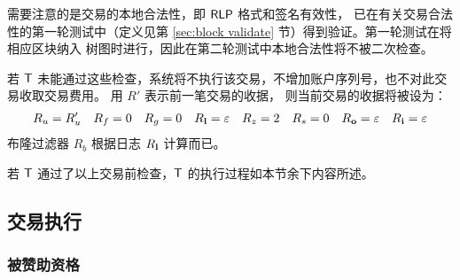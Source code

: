 需要注意的是交易的本地合法性，即 $\mathsf{RLP}$ 格式和签名有效性，
已在有关交易合法性的第一轮测试中（定义见第 \ref{sec:block validate} 节）得到验证。第一轮测试在将相应区块纳入 \name 树图时进行，因此在第二轮测试中本地合法性将不被二次检查。

若 $\textsf{T}$ 未能通过这些检查，系统将不执行该交易，不增加账户序列号，也不对此交易收取交易费用。
用 $R'$ 表示前一笔交易的收据，
则当前交易的收据将被设为：
\begin{align}
	R_u=R'_u && R_f=0 && R_g=0 && R_{\bf l}=\mathbb{\varepsilon} && R_z=2 && R_s=0 && R_{\bf o}=\mathbb{\varepsilon} && R_{\bf i}=\mathbb{\varepsilon}
\end{align}
%
布隆过滤器 $R_b$ 根据日志 $R_{\bf l}$ 计算而已。

若 $\textsf{T}$ 通过了以上交易前检查，$\textsf{T}$ 的执行过程如本节余下内容所述。

\subsection{交易执行}

\subsubsection{被赞助资格}


